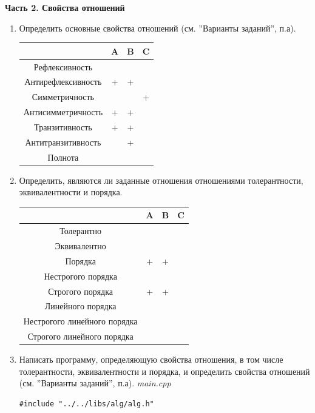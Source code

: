 \documentclass[a4paper,14pt]{extarticle}
\begin{document}
    \begin{center} \textbf{Часть 2. Свойства отношений} \end{center}
    \begin{enumerate}[label=2.\arabic*.]
    	\item Определить основные свойства отношений (см. ”Варианты заданий”, п.а).\\
    	\begin{tabular}{|c|c|c|c|}
    		\hline
    		&A&B&C\\
    		\hline
    		Рефлексивность& & &\\
    		\hline
    		Антирефлексивность&+&+&\\
    		\hline
    		Симметричность& & &+\\
    		\hline
    		Антисимметричность&+&+&\\
    		\hline
    		Транзитивность&+&+&\\
    		\hline
    		Антитранзитивность&&+&\\
    		\hline
    		Полнота&&&\\
    		\hline
    		\end{tabular}
    	\item Определить, являются ли заданные отношения отношениями толерантности, эквивалентности и порядка.\\
    	\begin{tabular}{|c|c|c|c|}
    		\hline
    		&A&B&C\\
    		\hline
    		Толерантно&&&\\
    		\hline
    		Эквивалентно&&&\\
    		\hline
    		Порядка&+&+&\\
    		\hline
    		Нестрогого порядка&&&\\
    		\hline
    		Строгого порядка&+&+&\\
    		\hline
    		Линейного порядка&&&\\
    		\hline
    		Нестрогого линейного порядка&&&\\
    		\hline
    		Строгого линейного порядка&&&\\
    		
    		\hline
    	\end{tabular}
    	\item Написать программу, определяющую свойства отношения, в том числе толерантности, эквивалентности и порядка, и определить свойства отношений (см. ”Варианты заданий”, п.а).
    	\textit{main.cpp}
    	\begin{verbatim}
#include "../../libs/alg/alg.h"


\end{verbatim}
\end{enumerate}
\end{document}
